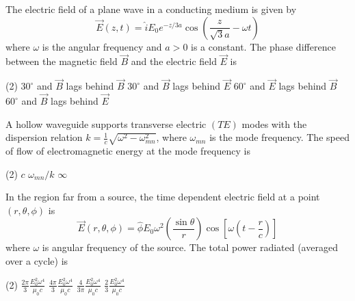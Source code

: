 \begin{enumerate}
\begin{minipage}{\textwidth}
	\item The electric field of a plane wave in a conducting medium is given by
	$$
	\vec{E}(z, t)=\hat{i} E_{0} e^{-z / 3 a} \cos \left(\frac{z}{\sqrt{3} a}-\omega t\right)
	$$
	where $\omega$ is the angular frequency and $a>0$ is a constant. The phase difference between the magnetic field $\vec{B}$ and the electric field $\vec{E}$ is
\end{minipage}
\begin{tasks}(2)
	\task[\textbf{A.}] $30^{\circ}$ and $\vec{B}$ lags behind $\vec{B}$
	\task[\textbf{B.}]$30^{\circ}$ and $\vec{B}$ lags behind $\vec{E}$
	\task[\textbf{C.}]$60^{\circ}$ and $\vec{E}$ lags behind $\vec{B}$
	\task[\textbf{D.}]$60^{\circ}$ and $\vec{B}$ lags behind $\vec{E}$
\end{tasks}
\begin{minipage}{\textwidth}
	\item A hollow waveguide supports transverse electric $(T E)$ modes with the dispersion relation $k=\frac{1}{c} \sqrt{\omega^{2}-\omega_{m n}^{2}}$, where $\omega_{m n}$ is the mode frequency. The speed of flow of electromagnetic energy at the mode frequency is
\end{minipage}
\begin{tasks}(2)
	\task[\textbf{A.}] $c$
	\task[\textbf{B.}] $\omega_{m n} / k$
	\task[\textbf{D.}] $\infty$
\end{tasks}
\begin{minipage}{\textwidth}
	\item In the region far from a source, the time dependent electric field at a point $(r, \theta, \phi)$ is
	$$
	\vec{E}(r, \theta, \phi)=\hat{\phi} E_{0} \omega^{2}\left(\frac{\sin \theta}{r}\right) \cos \left[\omega\left(t-\frac{r}{c}\right)\right]
	$$
	where $\omega$ is angular frequency of the source. The total power radiated (averaged over a cycle) is
\end{minipage}
\begin{tasks}(2)
	\task[\textbf{A.}] $\frac{2 \pi}{3} \frac{E_{0}^{2} \omega^{4}}{\mu_{0} c}$
	\task[\textbf{B.}]$\frac{4 \pi}{3} \frac{E_{0}^{2} \omega^{4}}{\mu_{0} c}$
	\task[\textbf{C.}]$\frac{4}{3 \pi} \frac{E_{0}^{2} \omega^{4}}{\mu_{0} c}$
	\task[\textbf{D.}]$\frac{2}{3} \frac{E_{0}^{2} \omega^{4}}{\mu_{0} c}$
\end{tasks}
\begin{minipage}{\textwidth}

\end{minipage}
\end{enumerate}
